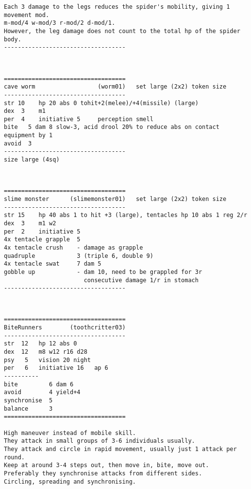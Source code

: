 \begin{samepage}
\begin{verbatim}
Each 3 damage to the legs reduces the spider's mobility, giving 1 movement mod.
m-mod/4 w-mod/3 r-mod/2 d-mod/1.
However, the leg damage does not count to the total hp of the spider body.
-----------------------------------
\end{verbatim} \normalsize \end{samepage}

\

\goodbreak \begin{samepage} \small \begin{verbatim}
===================================
cave worm                  (worm01)   set large (2x2) token size
-----------------------------------
str 10    hp 20 abs 0 tohit+2(melee)/+4(missile) (large)
dex  3    m1
per  4    initiative 5     perception smell
bite   5 dam 8 slow-3, acid drool 20% to reduce abs on contact equipment by 1
avoid  3
-----------------------------------
size large (4sq)
\end{verbatim} \normalsize \end{samepage}

\

\goodbreak \begin{samepage} \small \begin{verbatim}
===================================
slime monster      (slimemonster01)   set large (2x2) token size
-----------------------------------
str 15    hp 40 abs 1 to hit +3 (large), tentacles hp 10 abs 1 reg 2/r
dex  3    m1 w2
per  2    initiative 5
4x tentacle grapple  5
4x tentacle crush    - damage as grapple
quadruple            3 (triple 6, double 9)
4x tentacle swat     7 dam 5
gobble up            - dam 10, need to be grappled for 3r
                       consecutive damage 1/r in stomach
-----------------------------------
\end{verbatim} \normalsize \end{samepage}

\

\goodbreak \begin{samepage} \small \begin{verbatim}
===================================
BiteRunners        (toothcritter03)
-----------------------------------
str  12   hp 12 abs 0
dex  12   m8 w12 r16 d28
psy   5   vision 20 night
per   6   initiative 16   ap 6
----------
bite         6 dam 6
avoid        4 yield+4
synchronise  5
balance      3
===================================

High maneuver instead of mobile skill.
They attack in small groups of 3-6 individuals usually.
They attack and circle in rapid movement, usually just 1 attack per round.
Keep at around 3-4 steps out, then move in, bite, move out.
Preferably they synchronise attacks from different sides.
Circling, spreading and synchronising.
\end{verbatim} \normalsize \end{samepage}

